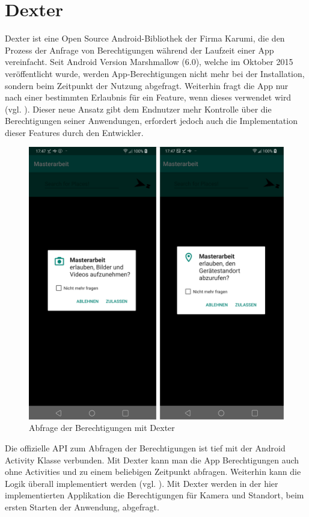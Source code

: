 \section{Dexter}

Dexter ist eine Open Source Android-Bibliothek der Firma Karumi, die den Prozess der Anfrage von Berechtigungen während der Laufzeit einer App vereinfacht. Seit Android Version Marshmallow (6.0), welche im Oktober 2015 veröffentlicht wurde, werden App-Berechtigungen nicht mehr bei der Installation, sondern beim Zeitpunkt der Nutzung abgefragt. Weiterhin fragt die App nur nach einer bestimmten Erlaubnis für ein Feature, wenn dieses verwendet wird (vgl. \cite{marshmallow}). Dieser neue Ansatz gibt dem Endnutzer mehr Kontrolle über die Berechtigungen seiner Anwendungen, erfordert jedoch auch die Implementation dieser Features durch den Entwickler. 

\begin{figure}[H]
	\centering
	\includegraphics[scale=0.14]{request.png}
	\caption{Abfrage der Berechtigungen mit Dexter}
\end{figure} 

Die offizielle API zum Abfragen der Berechtigungen ist tief mit der Android \glqq Activity\grqq{} Klasse verbunden. Mit Dexter kann man die App Berechtigungen auch ohne Activities und zu einem beliebigen Zeitpunkt abfragen. Weiterhin kann die Logik überall implementiert werden (vgl. \cite{dexter}). Mit Dexter werden in der hier implementierten Applikation die Berechtigungen für Kamera und Standort, beim ersten Starten der Anwendung, abgefragt.

